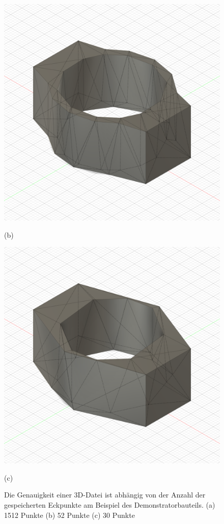 \begin{figure}[H]
\begin{minipage}{0.32\textwidth}
        \includegraphics[width=\linewidth]{images/image_demo_medium.PNG} %
        \caption*{(b)}
    \end{minipage}\hfill
    \begin{minipage}{0.32\textwidth}
        \centering
        \includegraphics[width=\linewidth]{images/image_demo_low.PNG} %
        \caption*{(c)}
    \end{minipage}\hfill

    \caption{Die Genauigkeit einer 3D-Datei ist abhängig von der Anzahl der gespeicherten
    Eckpunkte am Beispiel des Demonstratorbauteils. (a) 1512 Punkte
    (b) 52 Punkte (c) 30 Punkte}
    \label{fig:3d_design}
\end{figure}

